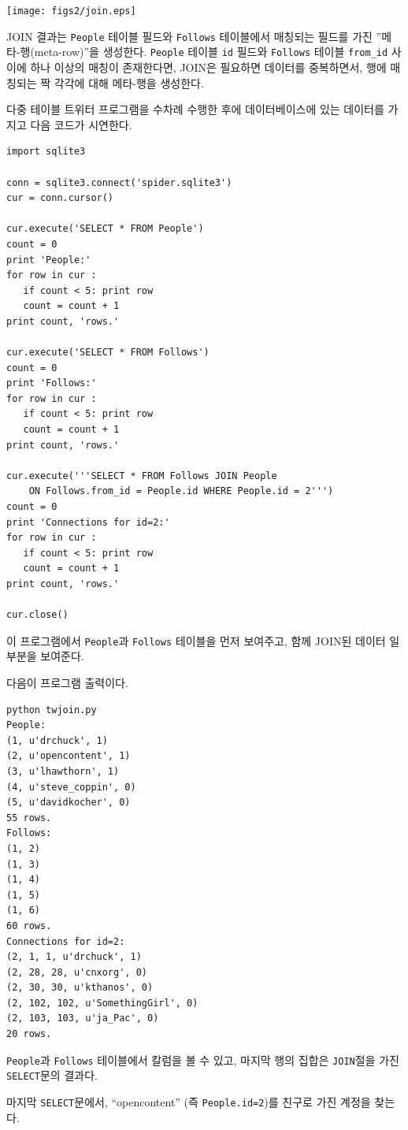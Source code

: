 \beforefig
\centerline{\texttt{[image: figs2/join.eps]}}
\afterfig

JOIN 결과는 {\tt People} 테이블 필드와 {\tt Follows} 테이블에서 매칭되는 필드를 가진 ''메타-행(meta-row)''을 생성한다.
{\tt People} 테이블 {\tt id} 필드와 {\tt Follows} 테이블 \verb"from_id" 사이에 하나 이상의 매칭이 존재한다면,
JOIN은 필요하면 데이터를 중복하면서, 행에 매칭되는 짝 각각에 대해 메타-행을 생성한다.

다중 테이블 트위터 프로그램을 수차례 수행한 후에 데이터베이스에 있는 데이터를 가지고 다음 코드가 시연한다.

\beforeverb
\begin{verbatim}
import sqlite3

conn = sqlite3.connect('spider.sqlite3')
cur = conn.cursor()

cur.execute('SELECT * FROM People')
count = 0
print 'People:'
for row in cur :
   if count < 5: print row
   count = count + 1
print count, 'rows.'

cur.execute('SELECT * FROM Follows')
count = 0
print 'Follows:'
for row in cur :
   if count < 5: print row
   count = count + 1
print count, 'rows.'

cur.execute('''SELECT * FROM Follows JOIN People 
    ON Follows.from_id = People.id WHERE People.id = 2''')
count = 0
print 'Connections for id=2:'
for row in cur :
   if count < 5: print row
   count = count + 1
print count, 'rows.'

cur.close()
\end{verbatim}
\afterverb
%

이 프로그램에서 {\tt People}과 {\tt Follows} 테이블을 먼저 보여주고, 함께 JOIN된 데이터 일부분을 보여준다.

다음이 프로그램 출력이다.

\beforeverb
\begin{verbatim}
python twjoin.py 
People:
(1, u'drchuck', 1)
(2, u'opencontent', 1)
(3, u'lhawthorn', 1)
(4, u'steve_coppin', 0)
(5, u'davidkocher', 0)
55 rows.
Follows:
(1, 2)
(1, 3)
(1, 4)
(1, 5)
(1, 6)
60 rows.
Connections for id=2:
(2, 1, 1, u'drchuck', 1)
(2, 28, 28, u'cnxorg', 0)
(2, 30, 30, u'kthanos', 0)
(2, 102, 102, u'SomethingGirl', 0)
(2, 103, 103, u'ja_Pac', 0)
20 rows.
\end{verbatim}
\afterverb
%

{\tt People}과 {\tt Follows} 테이블에서 칼럼을 볼 수 있고, 마지막 행의 집합은 {\tt JOIN}절을 가진 {\tt SELECT}문의 결과다.

마지막 {\tt SELECT}문에서, ``opencontent'' (즉 {\tt People.id=2})를 친구로 가진 계정을 찾는다.

